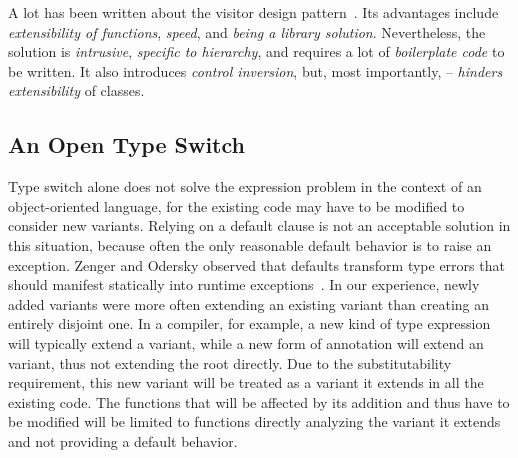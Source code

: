 A lot has been written about the visitor design pattern~\cite{DesignPatterns1993,Palsberg98,Zenger:2001,Oliveira08}. 
Its advantages include \emph{extensibility of functions}, \emph{speed}, and 
\emph{being a library solution}. Nevertheless, the solution is \emph{intrusive}, 
\emph{specific to hierarchy}, and requires a lot of \emph{boilerplate code} to 
be written. It also introduces \emph{control inversion}, but, most importantly, 
-- \emph{hinders extensibility} of classes.


\subsection{An Open Type Switch}

Type switch alone does not solve the expression problem in the context
of an object-oriented language, for the existing code may have to be 
modified to consider new variants. Relying on a default clause is not 
an acceptable solution in this situation, because often the 
only reasonable default behavior is to raise an exception. 
Zenger and Odersky observed that defaults transform type errors that should
manifest statically into runtime exceptions~\cite{fool12}.
In our experience, newly added variants were more often extending an existing 
variant than creating an entirely disjoint one. In a compiler, for 
example, a new kind of type expression will typically extend a 
 variant, while a new form of annotation will extend an 
 variant, thus not extending the root  directly. 
Due to the substitutability requirement, this new variant will be treated as a 
variant it extends in all the existing code. The functions that will be affected 
by its addition and thus have to be modified will be limited to functions 
directly analyzing the variant it extends and not providing a default behavior.

